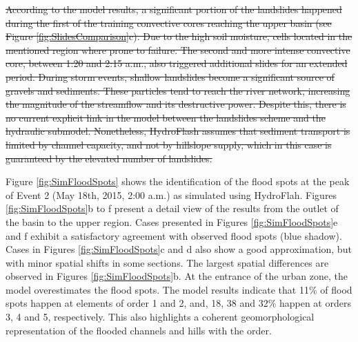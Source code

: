 \documentclass[hess, manuscript]{copernicus} %
\providecommand{\DIFdel}[1]{{\protect\color{red}\sout{#1}}}                      %
\providecommand{\DIFdelbegin}{} %
\providecommand{\DIFdelend}{} %
\begin{document}
\DIFdelbegin \DIFdel{According to the model results, a significant portion of the landslides happened during the first of the training convective cores reaching the upper basin (see Figure \ref{fig:SlidesComparison}c).  Due to the high soil moisture, cells located in the mentioned region where prone to failure. The second and more intense convective core, between 1:20 and 2:15 a.m.,  also triggered additional slides for an extended period.  During storm events, shallow landslides become a significant source of gravels and sediments.  These particles tend to reach the river network, increasing the magnitude of the streamflow and its destructive power.  Despite this, there is no current explicit link in the model between the landslides scheme and the hydraulic submodel.  Nonetheless, HydroFlash assumes that sediment transport is limited by channel capacity, and not by hillslope supply, which in this case is guaranteed by the elevated number of landslides.}%

\DIFdelend Figure \ref{fig:SimFloodSpots} shows the identification of the flood spots at the peak of Event 2 (May 18th, 2015, 2:00 a.m.) as simulated using HydroFlah. Figures \ref{fig:SimFloodSpots}b to f present a detail view of the results from the outlet of the basin to the upper region.  Cases presented in Figures \ref{fig:SimFloodSpots}e and f exhibit a satisfactory agreement with observed flood spots (blue shadow).  Cases in Figures \ref{fig:SimFloodSpots}c and d also show a good approximation, but with minor spatial shifts in some sections. The largest spatial differences are observed in Figures \ref{fig:SimFloodSpots}b. At the entrance of the urban zone, the model overestimates the flood spots.  The model results indicate that 11\% of flood spots happen at elements of order 1 and 2,  and, 18, 38 and 32\% happen at orders 3, 4 and 5, respectively.  This also highlights a coherent geomorphological representation of the flooded channels and hills with the order.\\   
\end{document}
